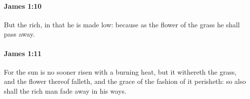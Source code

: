 		\paragraph{James 1:10} %
			\label{JAMES-1-10}

			But the rich, in that he is made low: because as the flower of the grass he shall pass away.	

			\begin{framed}
			\scriptsize
				\begin{compactdesc}
					\item[SBLG] 
				\end{compactdesc}
			\end{framed}

		\paragraph{James 1:11} %
			\label{JAMES-1-11}

			For the sun is no sooner risen with a burning heat, but it withereth the grass, and the flower thereof falleth, and the grace of the fashion of it perisheth: so also shall the rich man fade away in his ways.

